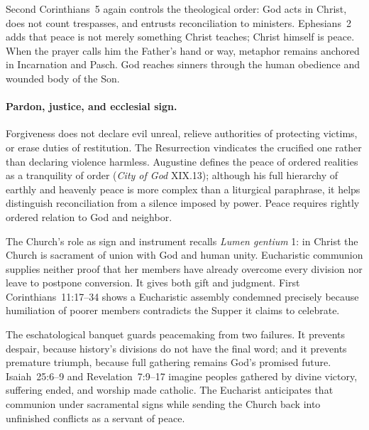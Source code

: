 Second Corinthians~5 again controls the theological order: God acts in Christ, does not count trespasses, and entrusts reconciliation to ministers. Ephesians~2 adds that peace is not merely something Christ teaches; Christ himself is peace. When the prayer calls him the Father's hand or way, metaphor remains anchored in Incarnation and Pasch. God reaches sinners through the human obedience and wounded body of the Son.

\paragraph{Pardon, justice, and ecclesial sign.}
Forgiveness does not declare evil unreal, relieve authorities of protecting victims, or erase duties of restitution. The Resurrection vindicates the crucified one rather than declaring violence harmless. Augustine defines the peace of ordered realities as a tranquility of order (\emph{City of God} XIX.13); although his full hierarchy of earthly and heavenly peace is more complex than a liturgical paraphrase, it helps distinguish reconciliation from a silence imposed by power. Peace requires rightly ordered relation to God and neighbor.

The Church's role as sign and instrument recalls \emph{Lumen gentium} 1: in Christ the Church is sacrament of union with God and human unity. Eucharistic communion supplies neither proof that her members have already overcome every division nor leave to postpone conversion. It gives both gift and judgment. First Corinthians~11:17--34 shows a Eucharistic assembly condemned precisely because humiliation of poorer members contradicts the Supper it claims to celebrate.

The eschatological banquet guards peacemaking from two failures. It prevents despair, because history's divisions do not have the final word; and it prevents premature triumph, because full gathering remains God's promised future. Isaiah~25:6--9 and Revelation~7:9--17 imagine peoples gathered by divine victory, suffering ended, and worship made catholic. The Eucharist anticipates that communion under sacramental signs while sending the Church back into unfinished conflicts as a servant of peace.


